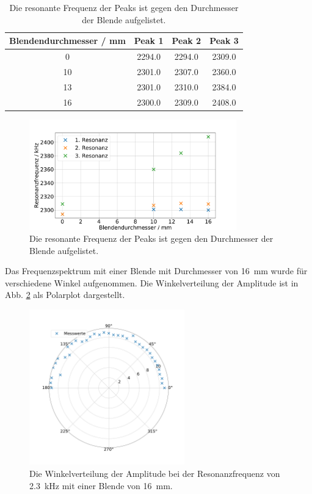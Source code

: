 \begin{table}\caption{Die resonante Frequenz der Peaks ist gegen den Durchmesser der Blende aufgelistet.}
    \label{tab:ende}
    \centering
     \begin{tabular}{c | c c c} 
    \toprule
{Blendendurchmesser / \si{\milli\meter}} & {Peak 1} & {Peak 2} & {Peak 3}   \\
\midrule
0  & 2294.0 & 2294.0 & 2309.0 \\ 
10 & 2301.0 & 2307.0 & 2360.0 \\
13 & 2301.0 & 2310.0 & 2384.0 \\
16 & 2300.0 & 2309.0 & 2408.0 \\
\bottomrule
\end{tabular}\end{table}

\begin{figure}
    \centering
    \includegraphics[width=0.8\textwidth]{plots/D_2.pdf}
    \caption{Die resonante Frequenz der Peaks ist gegen den Durchmesser der Blende aufgelistet.}
    \label{fig:resonanzen}
\end{figure}

Das Frequenzspektrum mit einer Blende mit Durchmesser von \SI{16}{\milli\metre} wurde für verschiedene Winkel aufgenommen. Die Winkelverteilung der Amplitude ist in Abb. \ref{fig:polar_molekuel} als Polarplot dargestellt. 

\begin{figure}
    \centering
    \includegraphics[width=0.6\textwidth]{plots/D_3.pdf}
    \caption{Die Winkelverteilung der Amplitude bei der Resonanzfrequenz von \SI{2.3}{\kilo\hertz} mit einer Blende von \SI{16}{\milli\metre}.}
    \label{fig:polar_molekuel}
\end{figure}

